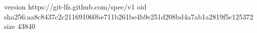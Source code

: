 version https://git-lfs.github.com/spec/v1
oid sha256:aa8c8437c2c211691060be711b261be4b9e251d208bd4a7ab1a2819f5c125372
size 43840
